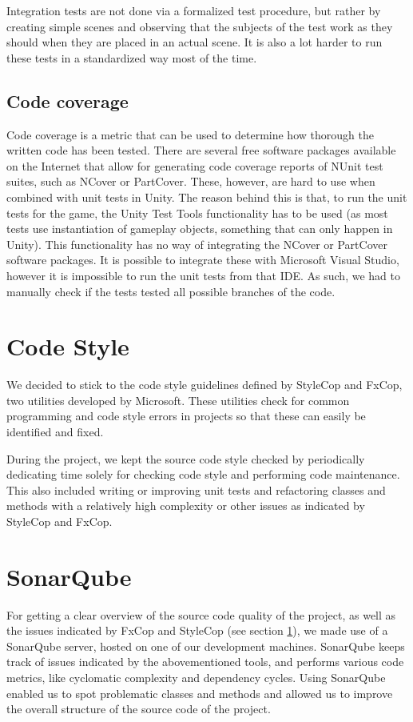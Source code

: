 		Integration tests are not done via a formalized test procedure, but rather by
		creating simple scenes and observing that the subjects of the test work
		as they should when they are placed in an actual scene. It is also a lot
		harder to run these tests in a standardized way most of the time. 
	
		\subsection{Code coverage} \label{ssec:codecoverage}
			Code coverage is a metric that can be used to determine how thorough
			the written code has been tested. There are several free software
			packages available on the Internet that allow for generating code
			coverage reports of NUnit test suites, such as NCover or PartCover.
			These, however, are hard to use when combined with unit tests in
			Unity. The reason behind this is that, to run the unit tests for
			the game, the Unity Test Tools functionality has to be used (as most
			tests use instantiation of gameplay objects, something that can
			only happen in Unity). This functionality has no way of integrating
			the NCover or PartCover software packages. It is possible to integrate
			these with Microsoft Visual Studio, however it is impossible to run
			the unit tests from that IDE. As such, we had to manually check
			if the tests tested all possible branches of the code.
			
	\section{Code Style} \label{sec:codestyle}
		We decided to stick to the code style guidelines defined by StyleCop and 
		FxCop, two utilities developed by Microsoft. These utilities check for 
		common programming and code style errors in projects so that these can 
		easily be identified and fixed. 
		
		During the project, we kept the source code style checked by periodically
		dedicating time solely for checking code style and performing code 
		maintenance. This also included writing or improving unit tests and 
		refactoring classes and methods with a relatively high complexity or other 
		issues as indicated by StyleCop and FxCop.
		
	\section{SonarQube} \label{sec:sonarqube}
		For getting a clear overview of the source code quality of the project, as 
		well as the issues indicated by FxCop and StyleCop (see section 
		\ref{sec:codestyle}), we made use of a SonarQube server, hosted on one of 
		our development machines. SonarQube keeps track of issues indicated by 
		the abovementioned tools, and performs various code metrics, like cyclomatic 
		complexity and dependency cycles. Using SonarQube enabled us to spot 
		problematic classes and methods and allowed us to improve the overall 
		structure of the source code of the project.
		
